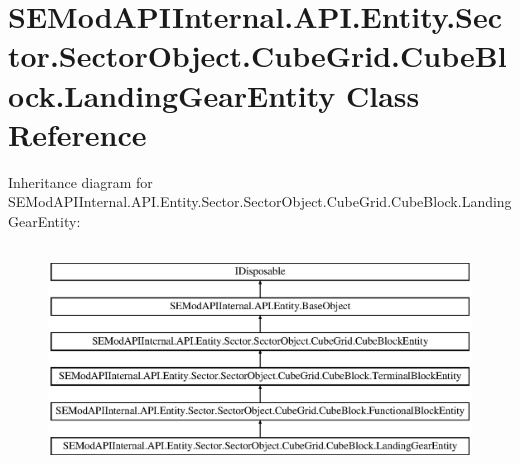 \hypertarget{class_s_e_mod_a_p_i_internal_1_1_a_p_i_1_1_entity_1_1_sector_1_1_sector_object_1_1_cube_grid_1_102e4670a1e074b947ebe3418c499e61c}{}\section{S\+E\+Mod\+A\+P\+I\+Internal.\+A\+P\+I.\+Entity.\+Sector.\+Sector\+Object.\+Cube\+Grid.\+Cube\+Block.\+Landing\+Gear\+Entity Class Reference}
\label{class_s_e_mod_a_p_i_internal_1_1_a_p_i_1_1_entity_1_1_sector_1_1_sector_object_1_1_cube_grid_1_102e4670a1e074b947ebe3418c499e61c}
Inheritance diagram for S\+E\+Mod\+A\+P\+I\+Internal.\+A\+P\+I.\+Entity.\+Sector.\+Sector\+Object.\+Cube\+Grid.\+Cube\+Block.\+Landing\+Gear\+Entity\+:\begin{figure}[H]
\begin{center}
\leavevmode
\includegraphics[height=6.000000cm]{class_s_e_mod_a_p_i_internal_1_1_a_p_i_1_1_entity_1_1_sector_1_1_sector_object_1_1_cube_grid_1_102e4670a1e074b947ebe3418c499e61c}
\end{center}
\end{figure}
